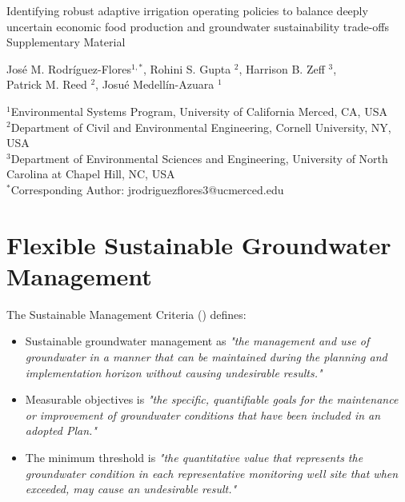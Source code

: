 \documentclass[11pt,a4paper]{article}
\date{}
\begin{document}
\begin{center}
\Large
Identifying robust adaptive irrigation operating policies to balance deeply uncertain economic food production and groundwater sustainability trade-offs \\ 
\vspace{0.5cm}
Supplementary Material
\end{center}

\begin{center}
José M. Rodríguez-Flores$^{1,*}$, Rohini S. Gupta $^2$, Harrison B. Zeff $^3$,\\ Patrick M. Reed $^2$, Josué Medellín-Azuara $^1$\\
\end{center}

\begin{center}
\small
$^1$Environmental Systems Program, University of California Merced, CA, USA\\
$^2$Department of Civil and Environmental Engineering, Cornell University, NY, USA\\
$^3$Department of Environmental Sciences and Engineering, University of North Carolina at Chapel Hill, NC, USA\\
$^*$Corresponding Author: jrodriguezflores3@ucmerced.edu
\end{center}

\vspace{0.2cm}

\section{Flexible Sustainable Groundwater Management}

The Sustainable Management Criteria (\cite{dwr_sustainable_2017}) defines:

\begin{itemize}
    \item Sustainable groundwater management as \textit{"the management and use of groundwater in a manner that can be maintained during the planning and implementation horizon without causing undesirable results."}
    \item Measurable objectives is \textit{"the specific, quantifiable goals for the maintenance or improvement of groundwater conditions that have been included in an adopted Plan."}
    \item The minimum threshold is \textit{"the quantitative value that represents the groundwater condition in each representative monitoring well site that when exceeded, may cause an undesirable result."}
\end{itemize}
\end{document}
